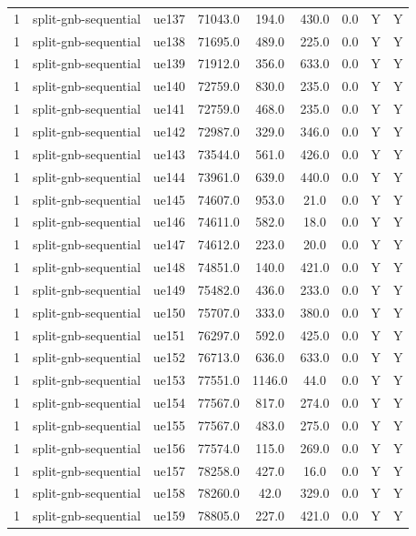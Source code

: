 \begin{table}[ht]
\begin{tabular}{|c|c|c|c|c|c|c|c|c|}
1 & split-gnb-sequential & ue137 & 71043.0 & 194.0 & 430.0 & 0.0 & Y & Y \\
1 & split-gnb-sequential & ue138 & 71695.0 & 489.0 & 225.0 & 0.0 & Y & Y \\
1 & split-gnb-sequential & ue139 & 71912.0 & 356.0 & 633.0 & 0.0 & Y & Y \\
1 & split-gnb-sequential & ue140 & 72759.0 & 830.0 & 235.0 & 0.0 & Y & Y \\
1 & split-gnb-sequential & ue141 & 72759.0 & 468.0 & 235.0 & 0.0 & Y & Y \\
1 & split-gnb-sequential & ue142 & 72987.0 & 329.0 & 346.0 & 0.0 & Y & Y \\
1 & split-gnb-sequential & ue143 & 73544.0 & 561.0 & 426.0 & 0.0 & Y & Y \\
1 & split-gnb-sequential & ue144 & 73961.0 & 639.0 & 440.0 & 0.0 & Y & Y \\
1 & split-gnb-sequential & ue145 & 74607.0 & 953.0 & 21.0 & 0.0 & Y & Y \\
1 & split-gnb-sequential & ue146 & 74611.0 & 582.0 & 18.0 & 0.0 & Y & Y \\
1 & split-gnb-sequential & ue147 & 74612.0 & 223.0 & 20.0 & 0.0 & Y & Y \\
1 & split-gnb-sequential & ue148 & 74851.0 & 140.0 & 421.0 & 0.0 & Y & Y \\
1 & split-gnb-sequential & ue149 & 75482.0 & 436.0 & 233.0 & 0.0 & Y & Y \\
1 & split-gnb-sequential & ue150 & 75707.0 & 333.0 & 380.0 & 0.0 & Y & Y \\
1 & split-gnb-sequential & ue151 & 76297.0 & 592.0 & 425.0 & 0.0 & Y & Y \\
1 & split-gnb-sequential & ue152 & 76713.0 & 636.0 & 633.0 & 0.0 & Y & Y \\
1 & split-gnb-sequential & ue153 & 77551.0 & 1146.0 & 44.0 & 0.0 & Y & Y \\
1 & split-gnb-sequential & ue154 & 77567.0 & 817.0 & 274.0 & 0.0 & Y & Y \\
1 & split-gnb-sequential & ue155 & 77567.0 & 483.0 & 275.0 & 0.0 & Y & Y \\
1 & split-gnb-sequential & ue156 & 77574.0 & 115.0 & 269.0 & 0.0 & Y & Y \\
1 & split-gnb-sequential & ue157 & 78258.0 & 427.0 & 16.0 & 0.0 & Y & Y \\
1 & split-gnb-sequential & ue158 & 78260.0 & 42.0 & 329.0 & 0.0 & Y & Y \\
1 & split-gnb-sequential & ue159 & 78805.0 & 227.0 & 421.0 & 0.0 & Y & Y \\

\end{tabular}
\end{table}
